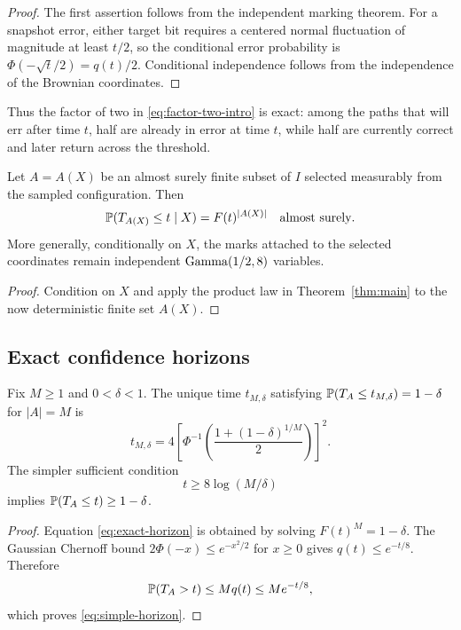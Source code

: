 \begin{proof}
The first assertion follows from the independent marking theorem.  For a
snapshot error, either target bit requires a centered normal fluctuation of
magnitude at least $t/2$, so the conditional error probability is
$\Phi(-\sqrt t/2)=q(t)/2$.  Conditional independence follows from the
independence of the Brownian coordinates.
\end{proof}

Thus the factor of two in \eqref{eq:factor-two-intro} is exact: among the paths
that will err after time $t$, half are already in error at time $t$, while half
are currently correct and later return across the threshold.

\begin{corollary}\label{cor:random-set}
Let $A=A(X)$ be an almost surely finite subset of $I$ selected measurably from
the sampled configuration.  Then
\begin{equation}\label{eq:random-set-cdf}
  \P(T_{A(X)}\le t\mid X)=F(t)^{|A(X)|}
  \quad\text{almost surely}.
\end{equation}
More generally, conditionally on $X$, the marks attached to the selected
coordinates remain independent $\GammaLaw(1/2,8)$ variables.
\end{corollary}

\begin{proof}
Condition on $X$ and apply the product law in Theorem~\ref{thm:main} to the
now deterministic finite set $A(X)$.
\end{proof}

\subsection{Exact confidence horizons}

\begin{corollary}\label{cor:horizons}
Fix $M\ge1$ and $0<\delta<1$.  The unique time $t_{M,\delta}$ satisfying
$\P(T_A\le t_{M,\delta})=1-\delta$ for $|A|=M$ is
\begin{equation}\label{eq:exact-horizon}
  t_{M,\delta}
  =4\left[
  \Phi^{-1}\!\left(
    \frac{1+(1-\delta)^{1/M}}{2}
  \right)\right]^2.
\end{equation}
The simpler sufficient condition
\begin{equation}\label{eq:simple-horizon}
  t\ge8\log(M/\delta)
\end{equation}
implies $\P(T_A\le t)\ge1-\delta$.
\end{corollary}

\begin{proof}
Equation \eqref{eq:exact-horizon} is obtained by solving $F(t)^M=1-\delta$.
The Gaussian Chernoff bound
$2\Phi(-x)\le e^{-x^2/2}$ for $x\ge0$ gives $q(t)\le e^{-t/8}$.
Therefore
\[
  \P(T_A>t)\le Mq(t)\le Me^{-t/8},
\]
which proves \eqref{eq:simple-horizon}.
\end{proof}
